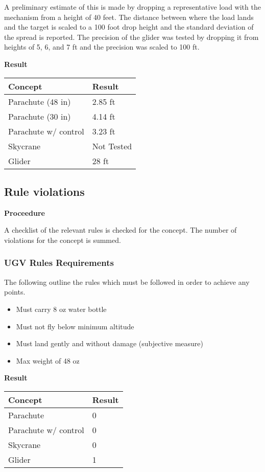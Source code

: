 \documentclass[]{auvsi_doc}
\begin{document}
	A preliminary estimate of this is made by dropping a representative load with the mechanism from a height of 40 feet. The distance between where the load lands and the target is scaled to a 100 foot drop height and the standard deviation of the spread is reported. The precision of the glider was tested by dropping it from heights of 5, 6, and 7 ft and the precision was scaled to 100 ft.

	\textbf{Result}

	\begin{tabular}{|l|l|}
		\hline
		\textbf{Concept}       & \textbf{Result} \\
		\hline
		Parachute (48 in)              &        2.85 ft        \\
		Parachute (30 in)		& 4.14 ft	\\
		Parachute w/ control   &      3.23 ft           \\
		Skycrane               &            Not Tested    \\
		Glider                 &		28 ft		 \\
		\hline
	\end{tabular}

	\subsection{Rule violations}
	\textbf{Proceedure}

	A checklist of the relevant rules is checked for the concept. The number of violations for the concept is summed.

\subsubsection{UGV Rules Requirements}
The following outline the rules which must be followed in order to achieve any points. 
\begin{itemize}
\item Must carry 8 oz water bottle
\item Must not fly below minimum altitude
\item Must land gently and without damage (subjective measure)
\item Max weight of 48 oz
\end{itemize}

	\textbf{Result}

	\begin{tabular}{|l|l|}
		\hline
		\textbf{Concept}       & \textbf{Result} \\
		\hline
		Parachute              &       0          \\
		Parachute w/ control   &       0         \\
		Skycrane               &            0     \\
		Glider                 &		1		 \\
		\hline
	\end{tabular}
\end{document}
